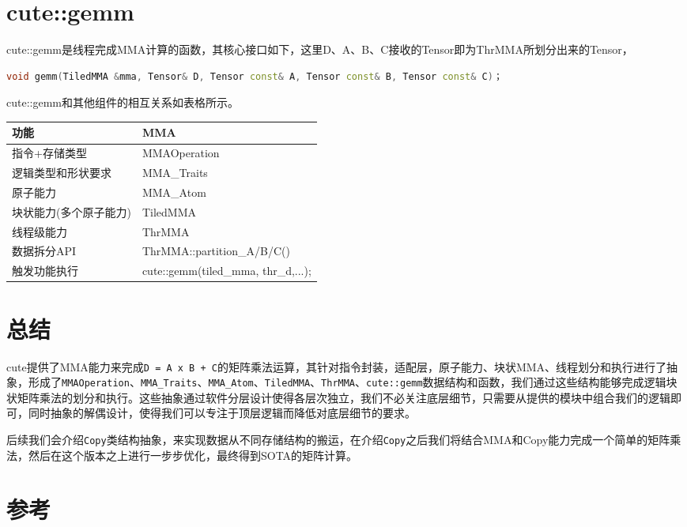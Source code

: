 \section{cute::gemm}

cute::gemm是线程完成MMA计算的函数，其核心接口如下，这里D、A、B、C接收的Tensor即为ThrMMA所划分出来的Tensor，

\begin{lstlisting}[language=C++]
void gemm(TiledMMA &mma, Tensor& D, Tensor const& A, Tensor const& B, Tensor const& C)；
\end{lstlisting}

cute::gemm和其他组件的相互关系如表格所示。

\begin{center}
\begin{tabular}{ll}
\toprule
功能 & MMA \\
\midrule
指令+存储类型 & MMAOperation \\
逻辑类型和形状要求 & MMA\_Traits \\
原子能力 & MMA\_Atom \\
块状能力(多个原子能力) & TiledMMA \\
线程级能力 & ThrMMA \\
数据拆分API & ThrMMA::partition\_A/B/C() \\
触发功能执行 & cute::gemm(tiled\_mma, thr\_d,...); \\
\bottomrule
\end{tabular}
\end{center}

\section{总结}

cute提供了MMA能力来完成\verb|D = A x B + C|的矩阵乘法运算，其针对指令封装，适配层，原子能力、块状MMA、线程划分和执行进行了抽象，形成了\verb|MMAOperation|、\verb|MMA_Traits|、\verb|MMA_Atom|、\verb|TiledMMA|、\verb|ThrMMA|、\verb|cute::gemm|数据结构和函数，我们通过这些结构能够完成逻辑块状矩阵乘法的划分和执行。这些抽象通过软件分层设计使得各层次独立，我们不必关注底层细节，只需要从提供的模块中组合我们的逻辑即可，同时抽象的解偶设计，使得我们可以专注于顶层逻辑而降低对底层细节的要求。

后续我们会介绍\verb|Copy|类结构抽象，来实现数据从不同存储结构的搬运，在介绍\verb|Copy|之后我们将结合MMA和Copy能力完成一个简单的矩阵乘法，然后在这个版本之上进行一步步优化，最终得到SOTA的矩阵计算。

\section{参考}

